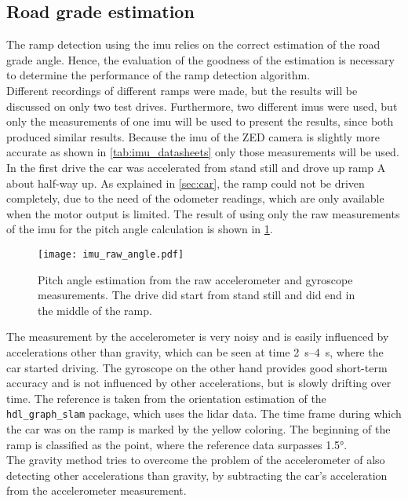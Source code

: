 \subsection{Road grade estimation}
The ramp detection using the \gls{imu} relies on the correct estimation of the road grade angle.
Hence, the evaluation of the goodness of the estimation is necessary to determine the performance of the ramp detection algorithm.\\
Different recordings of different ramps were made, but the results will be discussed on only two test drives.
Furthermore, two different \glspl{imu} were used, but only the measurements of one \gls{imu} will be used to present the results, since both produced similar results.
Because the \gls{imu} of the ZED camera is slightly more accurate as shown in \cref{tab:imu_datasheets} only those measurements will be used.
In the first drive the car was accelerated from stand still and drove up ramp A about half-way up.
As explained in \cref{sec:car}, the ramp could not be driven completely, due to the need of the odometer readings, which are only available when the motor output is limited.
The result of using only the raw measurements of the \gls{imu} for the pitch angle calculation is shown in \cref{fig:imu_raw_angle}.
\begin{figure}[htb]
	\centering
	\texttt{[image: imu\_raw\_angle.pdf]}
	\caption[Angle estimation using raw measurements]{Pitch angle estimation from the raw accelerometer and gyroscope measurements. The drive did start from stand still and did end in the middle of the ramp.}
	\label{fig:imu_raw_angle}
\end{figure}
The measurement by the accelerometer is very noisy and is easily influenced by accelerations other than gravity, which can be seen at time \SIrange{2}{4}{\second}, where the car started driving.
The gyroscope on the other hand provides good short-term accuracy and is not influenced by other accelerations, but is slowly drifting over time.
The reference is taken from the orientation estimation of the \texttt{hdl\_graph\_slam} package, which uses the \gls{lidar} data.
The time frame during which the car was on the ramp is marked by the yellow coloring.
The beginning of the ramp is classified as the point, where the reference data surpasses \ang{1.5}.\\
The gravity method tries to overcome the problem of the accelerometer of also detecting other accelerations than gravity, by subtracting the car's acceleration from the accelerometer measurement.
